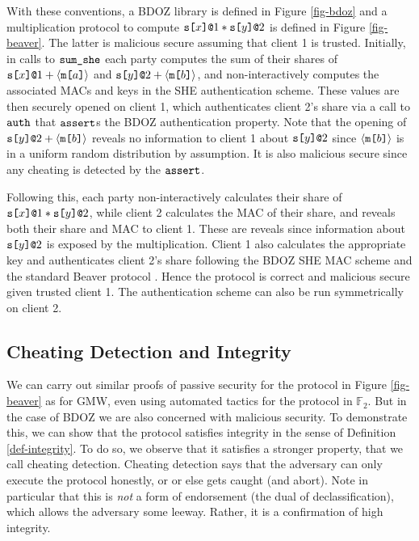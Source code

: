 With these conventions, a BDOZ library is defined in Figure
\ref{fig-bdoz} and a multiplication protocol to compute $\texttt{s[}x\texttt{]}\texttt{@}1 *
\texttt{s[}y\texttt{]}\texttt{@}2$ is defined in Figure \ref{fig-beaver}. The latter is
malicious secure assuming that client 1 is trusted. Initially, in
calls to $\texttt{sum\_she}$ each party computes the sum of their shares
of $\texttt{s[}x\texttt{]}\texttt{@}1 + \langle \texttt{m[}a\texttt{]} \rangle$ and $\texttt{s[}y\texttt{]}\texttt{@}2 + \langle \texttt{m[}b\texttt{]} \rangle$,
and non-interactively computes the associated MACs and keys in the
SHE authentication scheme. These values are then
securely opened on client 1, which authenticates client
2's share via a call to $\texttt{auth}$ that $\texttt{assert}$s
the BDOZ authentication property. Note that the
opening of $\texttt{s[}y\texttt{]}\texttt{@}2 + \langle \texttt{m[}b\texttt{]} \rangle$ reveals no
information to client 1 about $\texttt{s[}y\texttt{]}\texttt{@}2$ since $\langle \texttt{m[}b\texttt{]} \rangle$ is
in a uniform random distribution by assumption. It is
also malicious secure since any cheating is detected
by the $\texttt{assert}$.

Following this, each party non-interactively calculates their share of
$\texttt{s[}x\texttt{]}\texttt{@}1 * \texttt{s[}y\texttt{]}\texttt{@}2$, while client 2 calculates the MAC of
their share, and reveals both their share and MAC to client 1. These
are reveals since information about $\texttt{s[}y\texttt{]}\texttt{@}2$ is exposed by
the multiplication.  Client 1 also calculates the appropriate key and
authenticates client 2's share following the BDOZ SHE MAC scheme
\cite{10.1007/978-3-030-68869-1_3} and the standard Beaver protocol
\cite{evans2018pragmatic}. Hence the protocol is correct and
malicious secure given trusted client 1. The authentication scheme
can also be run symmetrically on client 2.



\subsection{Cheating Detection and Integrity}

We can carry out similar proofs of passive security for the protocol
in Figure \ref{fig-beaver} as for GMW, even using automated tactics
for the protocol in $\mathbb{F}_2$. But in the case of BDOZ we are
also concerned with malicious security. To demonstrate this, we can
show that the protocol satisfies integrity in the sense of Definition
\ref{def-integrity}. To do so, we observe that it satisfies a stronger
property, that we call cheating detection. Cheating detection says
that the adversary can only execute the protocol honestly, or or else
gets caught (and abort). Note in particular that this is \emph{not}
a form of endorsement (the dual of declassification), which allows
the adversary some leeway. Rather, it is a confirmation of high integrity.

